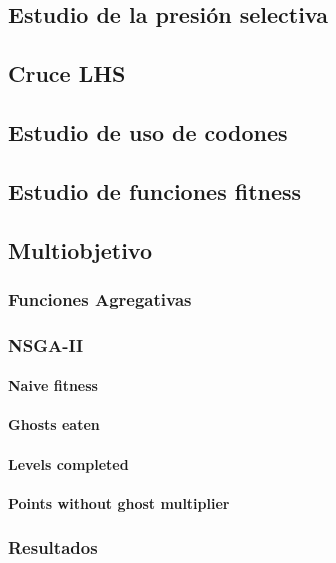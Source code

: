\subsection{Estudio de la presión selectiva}

\subsection{Cruce LHS}

\subsection{Estudio de uso de codones}

\subsection{Estudio de funciones fitness}

\subsection{Multiobjetivo}

\subsubsection{Funciones Agregativas}

\subsubsection{NSGA-II}

\paragraph{Naive fitness}

\paragraph{Ghosts eaten}

\paragraph{Levels completed}

\paragraph{Points without ghost multiplier}

\subsubsection{Resultados}

